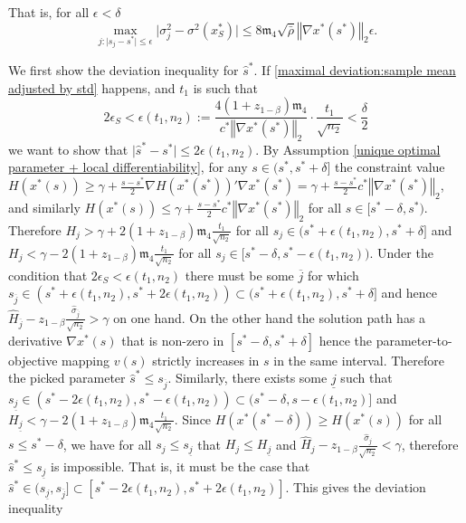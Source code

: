 \documentclass[mnsc,blindrev]{informs4} %
\newcommand{\norm}[1]{\left \Vert #1 \right\Vert}
\begin{document}
That is, for all $\epsilon<\delta$
\begin{equation}\label{deviation:variance}
    \max_{j:\lvert s_j-s^*\rvert\leq \epsilon}\lvert \sigma_j^2-\sigma^2(x^*_S)\rvert\leq 8\mathfrak{m}_4 \sqrt{\bar{\rho}}\norm{\nabla x^*(s^*)}_2\epsilon.
\end{equation}

We first show the deviation inequality for $\hat s^*$. If \eqref{maximal deviation:sample mean adjusted by std} happens, and $t_1$ is such that
\begin{equation}\label{choice of t1,p,n2}
   2\epsilon_S<\epsilon(t_1,n_2):=\frac{4(1+z_{1-\beta})\mathfrak{m}_4}{c^*\norm{\nabla x^*(s^*)}_2}\cdot\frac{t_1}{\sqrt{n_2}}<\frac{\delta}{2} %
\end{equation}
we want to show that $\lvert \hat s^*-s^*\rvert\leq 2\epsilon(t_1,n_2)$. By Assumption \ref{unique optimal parameter + local differentiability}, for any $s\in(s^*,s^*+\delta]$ the constraint value $H(x^*(s))\geq \gamma +\frac{s-s^*}{2}\nabla H(x^*(s^*))'\nabla x^*(s^*)=\gamma +\frac{s-s^*}{2}c^*\norm{\nabla x^*(s^*)}_2$, and similarly $H(x^*(s))\leq \gamma +\frac{s-s^*}{2}c^*\norm{\nabla x^*(s^*)}_2$ for all $s\in[s^*-\delta,s^*)$. Therefore $H_j> \gamma+2(1+z_{1-\beta})\mathfrak{m}_4\frac{t_1}{\sqrt{n_2}}$ for all $s_j\in (s^*+\epsilon(t_1,n_2),s^*+\delta]$ and $H_j< \gamma-2(1+z_{1-\beta})\mathfrak{m}_4\frac{t_1}{\sqrt{n_2}}$ for all $s_j\in [s^*-\delta,s^*-\epsilon(t_1,n_2))$. Under the condition that $2\epsilon_S<\epsilon(t_1,n_2)$ there must be some $\overline{j}$ for which $s_{\overline{j}}\in (s^*+\epsilon(t_1,n_2),s^*+2\epsilon(t_1,n_2))\subset (s^*+\epsilon(t_1,n_2),s^*+\delta]$ and hence $\hat H_{\overline{j}}-z_{1-\beta}\frac{\hat\sigma_{\overline{j}}}{\sqrt{n_2}}>\gamma$ on one hand. On the other hand the solution path has a derivative $\nabla x^*(s)$ that is non-zero in $[s^*-\delta,s^*+\delta]$ hence the parameter-to-objective mapping $v(s)$ strictly increases in $s$ in the same interval. Therefore the picked parameter $\hat s^*\leq s_{\overline{j}}$. Similarly, there exists some $\underline{j}$ such that  $s_{\underline{j}}\in (s^*-2\epsilon(t_1,n_2),s^*-\epsilon(t_1,n_2))\subset (s^*-\delta,s-\epsilon(t_1,n_2)]$ and $H_{\underline{j}}< \gamma-2(1+z_{1-\beta})\mathfrak{m}_4\frac{t_1}{\sqrt{n_2}}$. Since $H(x^*(s^*-\delta))\geq H(x^*(s))$ for all $s\leq s^*-\delta$, we have for all $s_j\leq s_{\underline{j}}$ that $H_j\leq H_{\underline{j}}$ and $\hat H_j-z_{1-\beta}\frac{\hat\sigma_j}{\sqrt{n_2}}<\gamma$, therefore $\hat s^*\leq s_{\underline{j}}$ is impossible. That is, it must be the case that $\hat s^*\in (s_{\underline{j}}, s_{\overline{j}}]\subset [s^*-2\epsilon(t_1,n_2),s^*+2\epsilon(t_1,n_2)]$. This gives the deviation inequality
\end{document}
